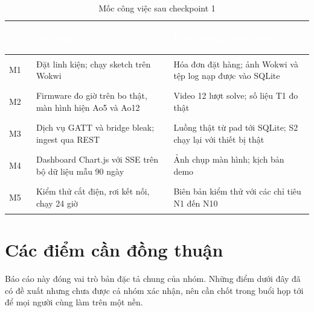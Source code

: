 \begin{table}[H]
    \centering
    \small
    \renewcommand{\arraystretch}{1.35}
    \caption{Mốc công việc sau checkpoint 1}
    \label{tab:milestones}
    \begin{tabular}{>{\bfseries\raggedright\arraybackslash}m{1.4cm} >{\raggedright\arraybackslash}m{6.4cm} >{\raggedright\arraybackslash}m{6.2cm}}
        \toprule
        \rowcolor{haitayblue}
        \textcolor{white}{Mốc} & \textcolor{white}{Nội dung} & \textcolor{white}{Bằng chứng hoàn thành} \\
        \midrule
        \rowcolor{haitayblue!8}
        M1 & Đặt linh kiện; chạy sketch trên Wokwi & Hóa đơn đặt hàng; ảnh Wokwi và tệp log nạp được vào SQLite \\
        M2 & Firmware đo giờ trên bo thật, màn hình hiện Ao5 và Ao12 & Video 12 lượt solve; số liệu T1 đo thật \\
        \rowcolor{haitayblue!8}
        M3 & Dịch vụ GATT và bridge bleak; ingest qua REST & Luồng thật từ pad tới SQLite; S2 chạy lại với thiết bị thật \\
        M4 & Dashboard Chart.js với SSE trên bộ dữ liệu mẫu 90 ngày & Ảnh chụp màn hình; kịch bản demo \\
        \rowcolor{haitayblue!8}
        M5 & Kiểm thử cắt điện, rơi kết nối, chạy 24 giờ & Biên bản kiểm thử với các chỉ tiêu N1 đến N10 \\
        \bottomrule
    \end{tabular}
\end{table}

\section{Các điểm cần đồng thuận}
Báo cáo này đóng vai trò bản đặc tả chung của nhóm. Những điểm dưới đây đã có đề xuất nhưng chưa được cả nhóm xác nhận, nên cần chốt trong buổi họp tới để mọi người cùng làm trên một nền.

